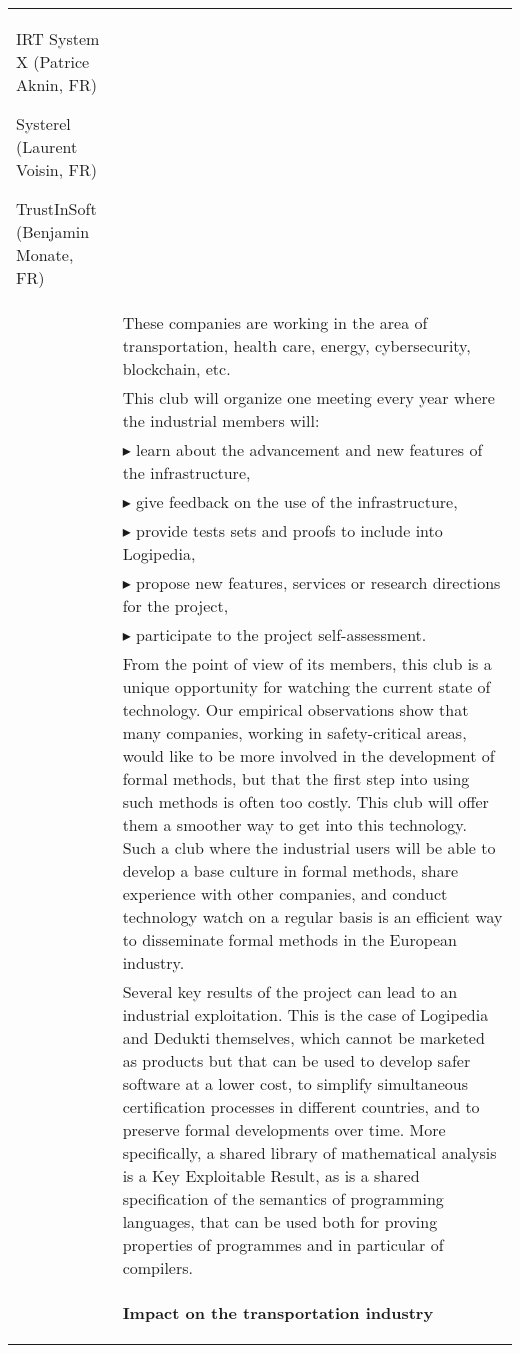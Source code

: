 \begin{longtable}{|p{}|p{}|}
\begin{framed}
\begin{compactitem}
\item IRT System X (Patrice Aknin, FR)
\item Systerel (Laurent Voisin, FR)
\item TrustInSoft (Benjamin Monate, FR)
\end{compactitem}
\end{framed}\\
&
\hspace{0.4cm}
These companies are working in the area of transportation, health
care, energy, cybersecurity, blockchain, etc.
\\
&
\hspace{0.4cm}
This club will organize one meeting every year where the
industrial members will:\\
&
$\blacktriangleright$
learn about the advancement and new features of the infrastructure,\\
&
$\blacktriangleright$
give feedback on the use of the infrastructure,
\\
&
$\blacktriangleright$ provide tests sets and proofs to include into Logipedia,
\\
&
$\blacktriangleright$ propose new features, services or research directions for the project,
\\
&
$\blacktriangleright$ participate to the project self-assessment.\\
&
\hspace{0.4cm}
From the point of view of its members, this club is a unique
opportunity for watching the current state of technology. Our empirical observations show that
many companies, working in safety-critical areas, would like to be
more involved in the development of formal methods, but that the first
step into using such methods is often too costly. This club will offer
them a smoother way to get into this technology. Such a club
where the industrial users will be able to develop a base culture in
formal methods, share experience with other companies, and conduct
technology watch on a regular basis is an efficient way to disseminate
formal methods in the European industry.\\
&
\hspace{0.4cm}
Several key results of the project can lead to an industrial
exploitation. This is the case of Logipedia and Dedukti themselves,
which cannot be marketed as products but that can be used to develop safer
software at a lower cost, to simplify simultaneous certification
processes in different countries, and to preserve formal developments
over time. More specifically, a shared library of mathematical analysis is a Key
Exploitable Result, as is a shared specification of the semantics of
programming languages, that can be used both for proving properties of
programmes and in particular of compilers.\\
&
\begin{framed}
{\bf \Large Impact on the transportation industry}


\end{framed}
\end{longtable}
